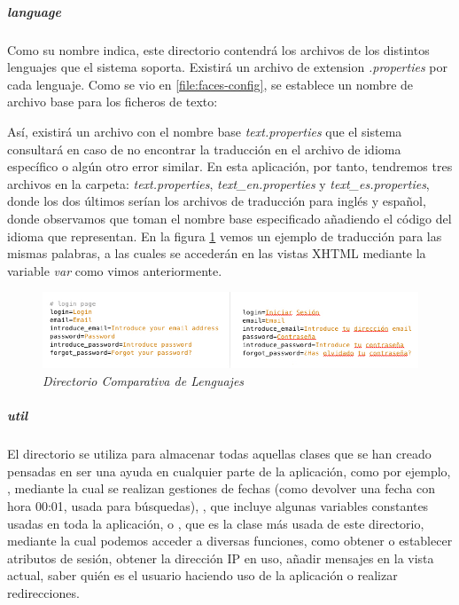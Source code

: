 \subparagraph{\textit{language}} \label{lenguajes}

Como su nombre indica, este directorio contendrá los archivos de los distintos lenguajes que el sistema soporta. Existirá un archivo de extension \textit{.properties} por cada lenguaje. Como se vio en \ref{file:faces-config}, se establece un nombre de archivo base para los ficheros de texto:



Así, existirá un archivo con el nombre base \textit{text.properties} que el sistema consultará en caso de no encontrar la traducción en el archivo de idioma específico o algún otro error similar. En esta aplicación, por tanto, tendremos tres archivos en la carpeta: \textit{text.properties}, \textit{text\_en.properties} y \textit{text\_es.properties}, donde los dos últimos serían los archivos de traducción para inglés y español, donde observamos que toman el nombre base especificado añadiendo el código del idioma que representan. En la figura \ref{fig:comparacion-lenguajes} vemos un ejemplo de traducción para las mismas palabras, a las cuales se accederán en las vistas XHTML mediante la variable \textit{var} como vimos anteriormente.

\begin{figure}
\centering
  \includegraphics[scale=.60]{img/comparacion-lenguajes.jpg}
  \caption{\textit{Directorio Comparativa de Lenguajes}}
  \label{fig:comparacion-lenguajes}
\end{figure}


\subparagraph{\textit{util}}

El directorio  se utiliza para almacenar todas aquellas clases que se han creado pensadas en ser una ayuda en cualquier parte de la aplicación, como por ejemplo, , mediante la cual se realizan gestiones de fechas (como devolver una fecha con hora 00:01, usada para búsquedas), , que incluye algunas variables constantes usadas en toda la aplicación, o , que es la clase más usada de este directorio, mediante la cual podemos acceder a diversas funciones, como obtener o establecer atributos de sesión, obtener la dirección IP en uso, añadir mensajes en la vista actual, saber quién es el usuario haciendo uso de la aplicación o realizar redirecciones.\\
\\

